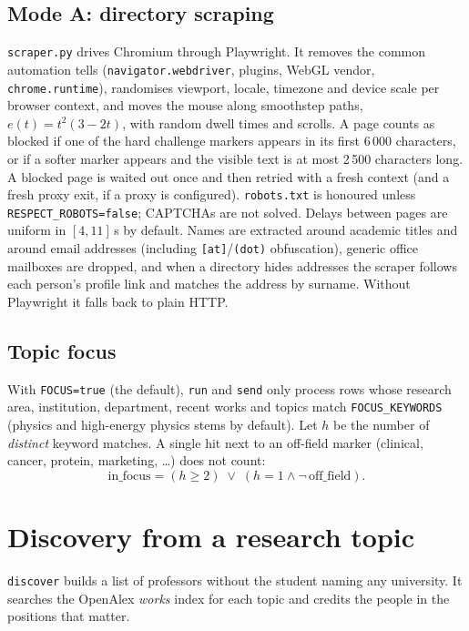 \documentclass[11pt,a4paper]{article}
\newcommand{\code}[1]{\texttt{#1}}
\begin{document}
\subsection{Mode A: directory scraping}
\code{scraper.py} drives Chromium through Playwright. It removes the common automation tells
(\code{navigator.webdriver}, plugins, WebGL vendor, \code{chrome.runtime}), randomises viewport,
locale, timezone and device scale per browser context, and moves the mouse along smoothstep
paths, $e(t) = t^2(3-2t)$, with random dwell times and scrolls. A page counts as blocked if one of
the hard challenge markers appears in its first 6\,000 characters, or if a softer marker appears
and the visible text is at most 2\,500 characters long. A blocked page is waited out once and then
retried with a fresh context (and a fresh proxy exit, if a proxy is configured).
\code{robots.txt} is honoured unless \code{RESPECT\_ROBOTS=false}; CAPTCHAs are not solved.
Delays between pages are uniform in $[4, 11]$\,s by default. Names are extracted around
academic titles and around email addresses (including \code{[at]}/\code{(dot)} obfuscation),
generic office mailboxes are dropped, and when a directory hides addresses the scraper follows
each person's profile link and matches the address by surname. Without Playwright it falls back
to plain HTTP.

\subsection{Topic focus}
With \code{FOCUS=true} (the default), \code{run} and \code{send} only process rows whose
research area, institution, department, recent works and topics match \code{FOCUS\_KEYWORDS}
(physics and high-energy physics stems by default). Let $h$ be the number of
\emph{distinct} keyword matches. A single hit next to an off-field marker (clinical, cancer,
protein, marketing, \ldots) does not count:
\[
  \text{in\_focus} = (h \ge 2) \;\lor\; (h = 1 \land \lnot\,\text{off\_field}) .
\]

\section{Discovery from a research topic}\label{sec:discover}

\code{discover} builds a list of professors without the student naming any university. It
searches the OpenAlex \emph{works} index for each topic and credits the people in the positions
that matter.
\end{document}
